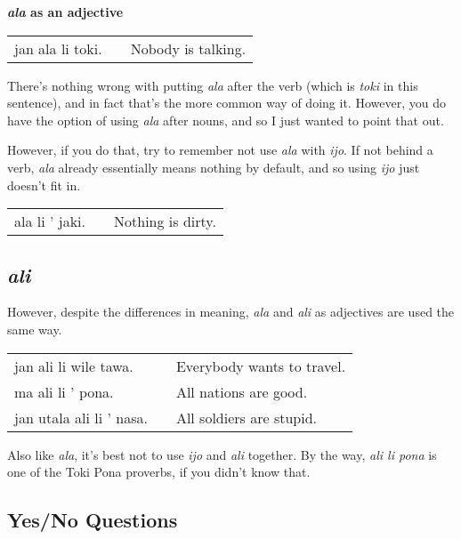 \textbf{\textit{ala} as an adjective}

\begin{supertabular}{p{5,5cm}|ll}
jan ala li toki. && Nobody is talking. \\
\end{supertabular} 

There's nothing wrong with putting \textit{ala} after the verb (which is \textit{toki} in this sentence), and in fact that's the more common way of doing it. 
However, you do have the option of using \textit{ala} after nouns, and so I just wanted to point that out. 

However, if you do that, try to remember not use \textit{ala} with \textit{ijo}. 
If not behind a verb, \textit{ala} already essentially means nothing by default, and so using \textit{ijo} just doesn't fit in.

\begin{supertabular}{p{5,5cm}|ll}
ala li ' jaki. && Nothing is dirty. \\
\end{supertabular} 
%
\subsection*{\textit{ali}}
%
However, despite the differences in meaning, \textit{ala} and \textit{ali} as adjectives are used the same way.

\begin{supertabular}{p{5,5cm}|ll}
jan ali li wile tawa. && Everybody wants to travel. \\
ma ali li ' pona. && All nations are good. \\
jan utala ali li ' nasa. && All soldiers are stupid.
\end{supertabular} 

Also like \textit{ala}, it's best not to use \textit{ijo} and \textit{ali} together. 
By the way, \textit{ali li pona} is one of the Toki Pona proverbs, if you didn't know that.  
%
{}
\subsection*{Yes/No Questions}

